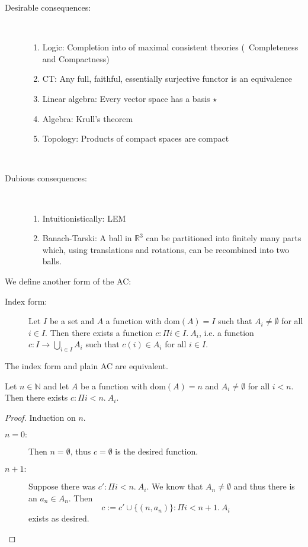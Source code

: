 \documentclass{whrartcl}
\newcommand{\NN}{\mathbb{N}}
\newcommand{\RR}{\mathbb{R}}
\newcommand{\dom}{\text{dom}}
\begin{document}
\begin{description}
\item[Desirable consequences:] 
  \
  \begin{enumerate}
  \item Logic: Completion into of maximal consistent theories
    (~Completeness and Compactness)
  \item CT: Any full, faithful, essentially surjective functor is an equivalence
  \item Linear algebra: Every vector space has a basis $\star$
  \item Algebra: Krull's theorem
  \item Topology: Products of compact spaces are compact
  \end{enumerate}
  \
\item[Dubious consequences:]
  \
  \begin{enumerate}
  \item Intuitionistically: LEM
  \item Banach-Tarski: A ball in $\RR^3$ can be partitioned into finitely many
    parts which, using translations and rotations, can be recombined into two balls.
  \end{enumerate}
\end{description}


\begin{definition}
  We define another form of the AC:
  \begin{description}
  \item[Index form:] Let $I$ be a set and $A$ a function with $\dom(A) = I$ such
    that $A_i \neq \emptyset$ for all $i \in I$.
    Then there exists a function $c : \Pi i \in I.~A_i$, i.e. a function $c : I
    \to \bigcup_{i \in I} A_i$ such that $c(i) \in A_i$ for all $i \in I$.
  \end{description}
\end{definition}

\begin{exercise}
  The index form and plain AC are equivalent.
\end{exercise}

\begin{lemma}
  Let $n \in \NN$ and let $A$ be a function with $\dom(A) = n$ and $A_i \neq
  \emptyset$ for all $i < n$. Then there
  exists $c : \Pi i < n.~A_i$.
\end{lemma}
\begin{proof}
  Induction on $n$.
  \begin{description}
  \item[$n = 0:$] Then $n = \emptyset$, thus $c = \emptyset$ is the desired function.
  \item[$n + 1:$] Suppose there was $c' : \Pi i < n.~A_i$. We know that $A_n \neq
    \emptyset$ and thus there is an $a_n \in A_n$. Then
    \[
      c := c' \cup \{(n, a_n)\} : \Pi i < n + 1.~A_i
    \]
    exists as desired.
  \end{description}
\end{proof}
\end{document}
